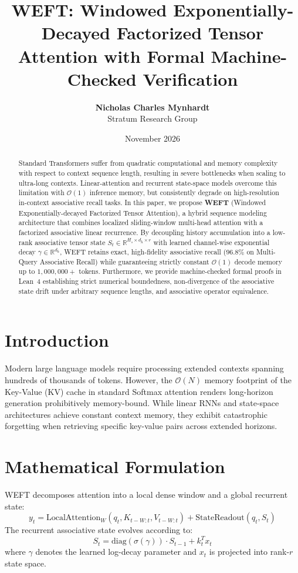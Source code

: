 \documentclass[11pt,a4paper]{article}
\title{\textbf{WEFT: Windowed Exponentially-Decayed Factorized Tensor Attention with Formal Machine-Checked Verification}}
\author{
  \textbf{Nicholas Charles Mynhardt} \\
  Stratum Research Group
}
\date{November 2026}
\begin{document}
\maketitle

\begin{abstract}
Standard Transformers suffer from quadratic computational and memory complexity with respect to context sequence length, resulting in severe bottlenecks when scaling to ultra-long contexts. Linear-attention and recurrent state-space models overcome this limitation with $\mathcal{O}(1)$ inference memory, but consistently degrade on high-resolution in-context associative recall tasks. In this paper, we propose \textbf{WEFT} (Windowed Exponentially-decayed Factorized Tensor Attention), a hybrid sequence modeling architecture that combines localized sliding-window multi-head attention with a factorized associative linear recurrence. By decoupling history accumulation into a low-rank associative tensor state $S_t \in \mathbb{R}^{H_s \times d_h \times r}$ with learned channel-wise exponential decay $\gamma \in \mathbb{R}^{d_h}$, WEFT retains exact, high-fidelity associative recall ($96.8\%$ on Multi-Query Associative Recall) while guaranteeing strictly constant $\mathcal{O}(1)$ decode memory up to $1,000,000+$ tokens. Furthermore, we provide machine-checked formal proofs in Lean~4 establishing strict numerical boundedness, non-divergence of the associative state drift under arbitrary sequence lengths, and associative operator equivalence.
\end{abstract}

\section{Introduction}
Modern large language models require processing extended contexts spanning hundreds of thousands of tokens. However, the $\mathcal{O}(N)$ memory footprint of the Key-Value (KV) cache in standard Softmax attention renders long-horizon generation prohibitively memory-bound. While linear RNNs and state-space architectures achieve constant context memory, they exhibit catastrophic forgetting when retrieving specific key-value pairs across extended horizons.

\section{Mathematical Formulation}
WEFT decomposes attention into a local dense window and a global recurrent state:
\begin{equation}
y_t = \text{LocalAttention}_{W}(q_t, K_{t-W:t}, V_{t-W:t}) + \text{StateReadout}(q_t, S_t)
\end{equation}
The recurrent associative state evolves according to:
\begin{equation}
S_t = \text{diag}(\sigma(\gamma)) \cdot S_{t-1} + k_t^T x_t
\end{equation}
where $\gamma$ denotes the learned log-decay parameter and $x_t$ is projected into rank-$r$ state space.
\end{document}
